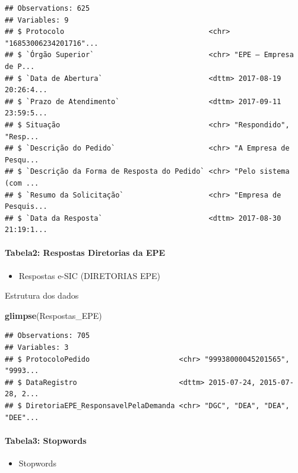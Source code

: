 \documentclass[]{article}
\newenvironment{Shaded}{\begin{snugshade}}{\end{snugshade}}
\newcommand{\KeywordTok}[1]{\textcolor[rgb]{0.13,0.29,0.53}{\textbf{#1}}}
\newcommand{\NormalTok}[1]{#1}
\providecommand{\tightlist}{%
  \setlength{\itemsep}{0pt}\setlength{\parskip}{0pt}}
\let\oldparagraph\paragraph
\renewcommand{\paragraph}[1]{\oldparagraph{#1}\mbox{}}
\begin{document}
\begin{verbatim}
## Observations: 625
## Variables: 9
## $ Protocolo                                  <chr> "16853006234201716"...
## $ `Órgão Superior`                           <chr> "EPE – Empresa de P...
## $ `Data de Abertura`                         <dttm> 2017-08-19 20:26:4...
## $ `Prazo de Atendimento`                     <dttm> 2017-09-11 23:59:5...
## $ Situação                                   <chr> "Respondido", "Resp...
## $ `Descrição do Pedido`                      <chr> "A Empresa de Pesqu...
## $ `Descrição da Forma de Resposta do Pedido` <chr> "Pelo sistema (com ...
## $ `Resumo da Solicitação`                    <chr> "Empresa de Pesquis...
## $ `Data da Resposta`                         <dttm> 2017-08-30 21:19:1...
\end{verbatim}

\hypertarget{tabela2-respostas-diretorias-da-epe}{%
\paragraph{Tabela2: Respostas Diretorias da
EPE}\label{tabela2-respostas-diretorias-da-epe}}

\begin{itemize}
\tightlist
\item
  Respostas e-SIC (DIRETORIAS EPE)
\end{itemize}

Estrutura dos dados

\begin{Shaded}
\begin{Highlighting}[]
\KeywordTok{glimpse}\NormalTok{(Respostas_EPE)}
\end{Highlighting}
\end{Shaded}

\begin{verbatim}
## Observations: 705
## Variables: 3
## $ ProtocoloPedido                     <chr> "99938000045201565", "9993...
## $ DataRegistro                        <dttm> 2015-07-24, 2015-07-28, 2...
## $ DiretoriaEPE_ResponsavelPelaDemanda <chr> "DGC", "DEA", "DEA", "DEE"...
\end{verbatim}

\hypertarget{tabela3-stopwords}{%
\paragraph{Tabela3: Stopwords}\label{tabela3-stopwords}}

\begin{itemize}
\tightlist
\item
  Stopwords
\end{itemize}
\end{document}

